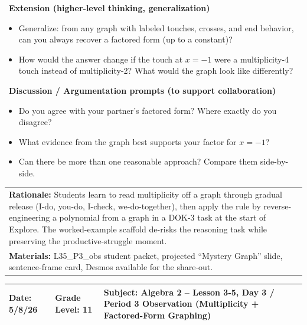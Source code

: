 \documentclass[11pt]{article}
\begin{document}
\vspace{1em}

\noindent \textbullet \ \textbf{Extension (higher-level thinking, generalization)}
\begin{itemize}[label=$\bullet$, leftmargin=0.5in]
    \item Generalize: from any graph with labeled touches, crosses, and end behavior, can you always recover a factored form (up to a constant)?
    \item How would the answer change if the touch at $x=-1$ were a multiplicity-4 touch instead of multiplicity-2? What would the graph look like differently?
\end{itemize}

\vspace{1em}

\noindent \textbullet \ \textbf{Discussion / Argumentation prompts (to support collaboration)}
\begin{itemize}[label=$\bullet$, leftmargin=0.5in]
    \item Do you agree with your partner's factored form? Where exactly do you disagree?
    \item What evidence from the graph best supports your factor for $x=-1$?
    \item Can there be more than one reasonable approach? Compare them side-by-side.
\end{itemize}

\newpage


\noindent
\begin{tabularx}{\textwidth}{|X|}
\hline
\textbf{Rationale:} Students learn to read multiplicity off a graph through gradual release (I-do, you-do, I-check, we-do-together), then apply the rule by reverse-engineering a polynomial from a graph in a DOK-3 task at the start of Explore. The worked-example scaffold de-risks the reasoning task while preserving the productive-struggle moment. \\
\textbf{Materials:} L35\_P3\_obs student packet, projected ``Mystery Graph'' slide, sentence-frame card, Desmos available for the share-out. \\
\hline
\end{tabularx}

\vspace{-1.2pt}
\noindent
\begin{tabularx}{\textwidth}{|>{\hsize=0.8\hsize}X|>{\hsize=0.8\hsize}X|>{\hsize=1.4\hsize}X|}
\hline
\textbf{Date:} 5/8/26 & \textbf{Grade Level:} 11 & \textbf{Subject:} Algebra 2 -- Lesson 3-5, Day 3 / Period 3 Observation (Multiplicity + Factored-Form Graphing) \\
\hline
\end{tabularx}
\end{document}
